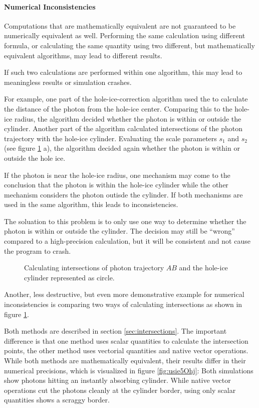 \paragraph{Numerical Inconsistencies}
Computations that are mathematically equivalent are not guaranteed to be numerically equivalent as well. Performing the same calculation using different formula, or calculating the same quantity using two different, but mathematically equivalent algorithms, may lead to different results.

If such two calculations are performed within one algorithm, this may lead to meaningless results or simulation crashes.

For example, one part of the hole-ice-correction algorithm used the  to calculate the distance of the photon from the hole-ice center. Comparing this to the hole-ice radius, the algorithm decided whether the photon is within or outside the cylinder. Another part of the algorithm calculated intersections of the photon trajectory with the hole-ice cylinder. Evaluating the scale parameters $s_1$ and $s_2$ (see figure \ref{fig:aeQuae2U} a), the algorithm decided again whether the photon is within or outside the hole ice.

If the photon is near the hole-ice radius, one mechanism may come to the conclusion that the photon is within the hole-ice cylinder while the other mechanism considers the photon outisde the cylinder. If both mechanisms are used in the same algorithm, this leads to inconsistencies.

The soluation to this problem is to only use one way to determine whether the photon is within or outside the cylinder. The decision may still be ``wrong'' compared to a high-precision calculation, but it will be consistent and not cause the program to crash.

\begin{figure}[htbp]
  \caption{Calculating intersections of photon trajectory $AB$ and the hole-ice cylinder represented as circle.}
  \label{fig:aeQuae2U}
\end{figure}


Another, less destructive, but even more demonstrative example for numerical inconsistencies is comparing two ways of calculating intersections as shown in figure \ref{fig:aeQuae2U}.

Both methods are described in section \ref{sec:intersections}. The important difference is that one method uses scalar quantities to calculate the intersection points, the other method uses vectorial quantities and native vector operations. While both methods are mathematically equivalent, their results differ in their numerical precisions, which is visualized in figure \ref{fig:usie5Ohj}: Both simulations show photons hitting an instantly absorbing cylinder. While native vector operations cut the photons cleanly at the cylinder border, using only scalar quantities shows a scraggy border.


